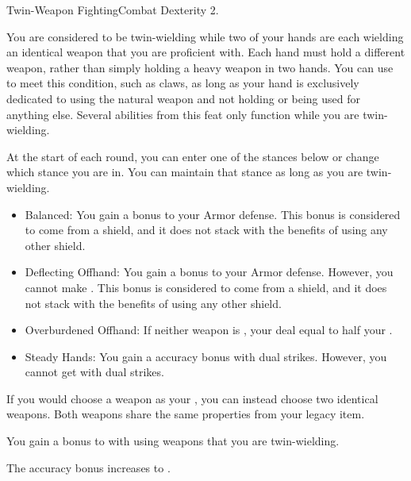   \begin{feat}{Twin-Weapon Fighting}{Combat}
    \featpre Dexterity 2.

     You are considered to be twin-wielding while two of your hands are each wielding an identical weapon that you are proficient with.
    Each hand must hold a different weapon, rather than simply holding a heavy weapon in two hands.
    You can use  to meet this condition, such as claws, as long as your hand is exclusively dedicated to using the natural weapon and not holding or being used for anything else.
    Several abilities from this feat only function while you are twin-wielding.

     At the start of each round, you can enter one of the stances below or change which stance you are in.
    You can maintain that stance as long as you are twin-wielding.
    \begin{itemize}
      \item Balanced: You gain a  bonus to your Armor defense.
        This bonus is considered to come from a shield, and it does not stack with the benefits of using any other shield.
      \item Deflecting Offhand: You gain a  bonus to your Armor defense.
        However, you cannot make .
        This bonus is considered to come from a shield, and it does not stack with the benefits of using any other shield.
      \item Overburdened Offhand: If neither weapon is , your  deal  equal to half your .
      \item Steady Hands: You gain a  accuracy bonus with dual strikes.
        However, you cannot get  with dual strikes.
    \end{itemize}

     If you would choose a weapon as your , you can instead choose two identical weapons.
    Both weapons share the same properties from your legacy item.

     You gain a  bonus to  with  using weapons that you are twin-wielding.

     The accuracy bonus increases to .
  \end{feat}

